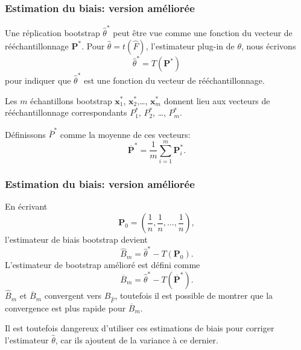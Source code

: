 \documentclass[t,usepdftitle=false]{beamer}
\def\bx{\boldsymbol{x}}
\def\bP{\boldsymbol{P}}
\begin{document}
\begin{frame}
\frametitle{Estimation du biais: version améliorée}

Une réplication bootstrap $\hat{\theta}^*$ peut être vue comme une
fonction du vecteur de rééchantillonnage $\bP^*$.
Pour $\hat{\theta} = t(\hat{F})$, l'estimateur plug-in de $\theta$,
nous écrivons
\[
\hat{\theta}^* = T(\bP^*)
\]
pour indiquer que $\hat{\theta}^*$ est une fonction du vecteur de
rééchantillonnage.

\mbox{}

Les $m$ échantillons bootstrap $\bx_1^*$, $\bx^*_2$,\ldots, $\bx^*_m$
donnent lieu aux vecteurs de rééchantillonnage correspondants $P_1^*$,
$P_2^*$, \ldots, $P_m^*$.

\mbox{}

Définissons $\overline{P}^*$ comme la moyenne de ces vecteurs:
\[
\overline{\bP}^* = \frac{1}{m} \sum_{i = 1}^m \bP^*_i.
\]

\end{frame}

\begin{frame}
\frametitle{Estimation du biais: version améliorée}

En écrivant
\[
\bP_0 = \left( \frac{1}{n}, \frac{1}{n},\ldots, \frac{1}{n} \right),
\]
l'estimateur de biais bootstrap devient
\[
\hat{B}_m = \hat{\theta}^* - T(\bP_0).
\]
L'estimateur de bootstrap amélioré est défini comme
\[
\overline{B}_m = \hat{\theta}^* - T(\overline{\bP}^*).
\]
$\hat{B}_m$ et $\overline{B}_m$ convergent vers $B_{\hat{F}}$,
toutefois il est possible de montrer que la convergence est plus
rapide pour $\overline{B}_m$.

Il est toutefois dangereux d'utiliser ces estimations de biais pour
corriger l'estimateur $\hat{\theta}$, car ils ajoutent de la variance
à ce dernier.
\end{frame}
\end{document}
